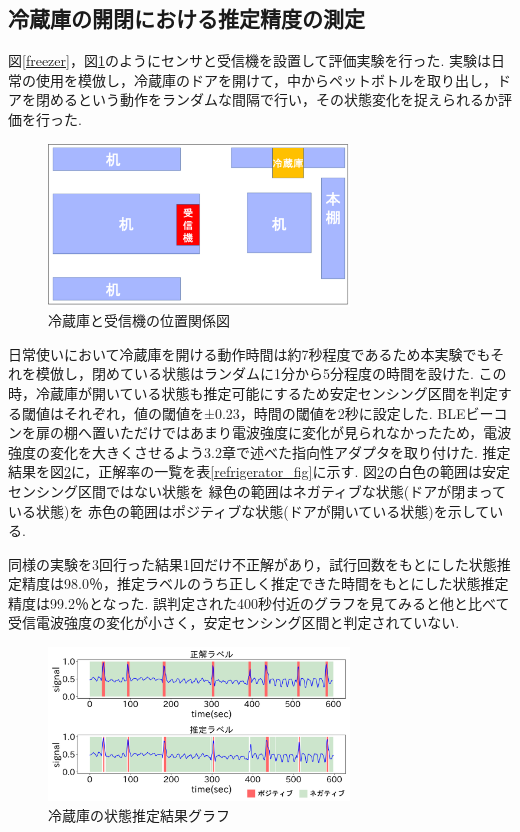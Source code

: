 \documentclass[Japanese]{dicomopapers}
\begin{document}
\subsection{冷蔵庫の開閉における推定精度の測定}
図\ref{freezer}，図\ref{refrigerator_position}のようにセンサと受信機を設置して評価実験を行った.
実験は日常の使用を模倣し，冷蔵庫のドアを開けて，中からペットボトルを取り出し，ドアを閉めるという動作をランダムな間隔で行い，その状態変化を捉えられるか評価を行った.


\begin{figure}[tbh]
    \centering
    \includegraphics[width=8cm]{refrigerator_position.png}
    \caption{冷蔵庫と受信機の位置関係図}
    \label{refrigerator_position}
\end{figure}


日常使いにおいて冷蔵庫を開ける動作時間は約7秒程度であるため本実験でもそれを模倣し，閉めている状態はランダムに1分から5分程度の時間を設けた.
この時，冷蔵庫が開いている状態も推定可能にするため安定センシング区間を判定する閾値はそれぞれ，値の閾値を±0.23，時間の閾値を2秒に設定した.
BLEビーコンを扉の棚へ置いただけではあまり電波強度に変化が見られなかったため，電波強度の変化を大きくさせるよう3.2章で述べた指向性アダプタを取り付けた.
推定結果を図\ref{refrigerator_graph}に，正解率の一覧を表\ref{refrigerator_fig}に示す.
図\ref{refrigerator_graph}の白色の範囲は安定センシング区間ではない状態を 緑色の範囲はネガティブな状態(ドアが閉まっている状態)を 赤色の範囲はポジティブな状態(ドアが開いている状態)を示している.

同様の実験を3回行った結果1回だけ不正解があり，試行回数をもとにした状態推定精度は98.0％，推定ラベルのうち正しく推定できた時間をもとにした状態推定精度は99.2％となった.
誤判定された400秒付近のグラフを見てみると他と比べて受信電波強度の変化が小さく，安定センシング区間と判定されていない.


\begin{figure}[tbh]
    \centering
    \includegraphics[width=8cm]{refrigerator_graph.png}
    \caption{冷蔵庫の状態推定結果グラフ}
    \label{refrigerator_graph}
\end{figure}
\end{document}
